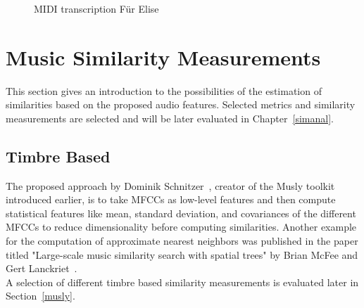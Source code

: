 \begin{figure}[htbp]
	\centering
	\caption{MIDI transcription Für Elise}
	\label{fig:transc}
\end{figure}
\FloatBarrier 

\section{Music Similarity Measurements}

This section gives an introduction to the possibilities of the estimation of similarities based on the proposed audio features. Selected metrics and similarity measurements are selected and will be later evaluated in Chapter~\ref{simanal}.

\subsection{Timbre Based}

The proposed approach by Dominik Schnitzer~\cite{schnitzer1}, creator of the Musly toolkit introduced earlier, is to take MFCCs as low-level features and then compute statistical features like mean, standard deviation, and covariances of the different MFCCs to reduce dimensionality before computing similarities. Another example for the computation of approximate nearest neighbors was published in the paper titled "Large-scale music similarity search with spatial trees" by Brian McFee and Gert Lanckriet~\cite{msd4}.\\ 
A selection of different timbre based similarity measurements is evaluated later in Section~\ref{musly}.

